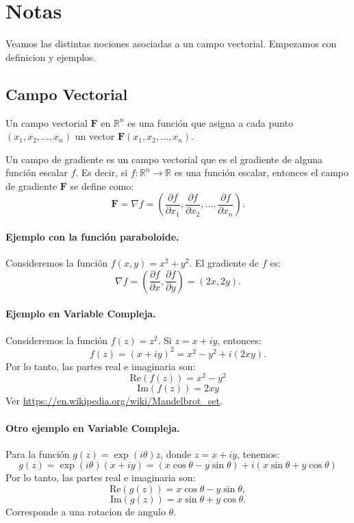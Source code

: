 \documentclass[11pt]{book}
\theoremstyle{definicion}
\theoremstyle{teorema}
\theoremstyle{ejemplo}
\begin{document}
\section{Notas}

\noindent Veamos las distintas nociones asociadas a un campo vectorial. Empezamos con definicion y ejemplos.

\subsection{Campo Vectorial}

\noindent
Un campo vectorial \( \mathbf{F} \) en \( \mathbb{R}^n \) es una función que asigna a cada punto \( (x_1, x_2, \ldots, x_n) \) un vector \( \mathbf{F}(x_1, x_2, \ldots, x_n) \).


Un campo de gradiente es un campo vectorial que es el gradiente de alguna función escalar \( f \). Es decir, si \( f: \mathbb{R}^n \to \mathbb{R} \) es una función escalar, entonces el campo de gradiente \( \mathbf{F} \) se define como:
\[ \mathbf{F} = \nabla f = \left( \frac{\partial f}{\partial x_1}, \frac{\partial f}{\partial x_2}, \ldots, \frac{\partial f}{\partial x_n} \right). \]

\paragraph{Ejemplo con la función paraboloide.} %
Consideremos la función \( f(x, y) = x^2 + y^2 \). El gradiente de \( f \) es:
\[ \nabla f = \left( \frac{\partial f}{\partial x}, \frac{\partial f}{\partial y} \right) = (2x, 2y). \]

\paragraph{Ejemplo en Variable Compleja.}
Consideremos la función \( f(z) = z^2 \). Si \( z = x + iy \), entonces:
\[ f(z) = (x + iy)^2 = x^2 - y^2 + i(2xy). \]
Por lo tanto, las partes real e imaginaria son:
\[ \text{Re}(f(z)) = x^2 - y^2 \]
\[ \text{Im}(f(z)) = 2xy \]
Ver \url{https://en.wikipedia.org/wiki/Mandelbrot_set}.

\paragraph{Otro ejemplo en Variable Compleja.}
Para la función \( g(z) = \exp(i\theta) z \), donde \( z = x + iy \), tenemos:
\[ g(z) = \exp(i\theta) (x + iy) = (x \cos \theta - y \sin \theta) + i(x \sin \theta + y \cos \theta) \]
Por lo tanto, las partes real e imaginaria son:
\[ \text{Re}(g(z)) = x \cos \theta - y \sin \theta, \]
\[ \text{Im}(g(z)) = x \sin \theta + y \cos \theta. \]
Corresponde a una rotacion de angulo $\theta$.
\end{document}
